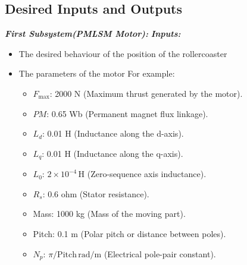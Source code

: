 \documentclass{article}
\begin{document}
    \subsection{Desired Inputs and Outputs}
    \textbf{\textit{First Subsystem(PMLSM Motor):}}
    \newline
    \textbf{\textit{Inputs:}}
    \begin{itemize}
        \item The desired behaviour of the position of the rollercoaster

        \item The parameters of the motor For example:
            \begin{itemize}
                \item $F_{\text{max}}$: 2000 N (Maximum thrust generated by the motor).

                \item $PM$: 0.65 Wb (Permanent magnet flux linkage).

                \item $L_{d}$: 0.01 H (Inductance along the d-axis).

                \item $L_{q}$: 0.01 H (Inductance along the q-axis).

                \item $L_{0}$: $2 \times 10^{-4}\, \text{H}$ (Zero-sequence axis
                    inductance).

                \item $R_{s}$: 0.6 ohm (Stator resistance).

                \item Mass: 1000 kg (Mass of the moving part).

                \item Pitch: 0.1 m (Polar pitch or distance between poles).

                \item $N_{p}$: $\pi/\text{Pitch}\, \text{rad/m}$ (Electrical pole-pair
                    constant).
            \end{itemize}
    \end{itemize}
\end{document}
